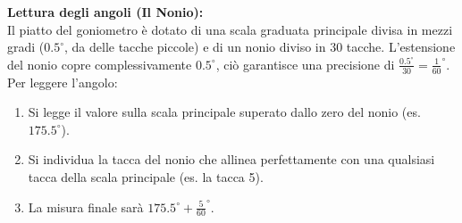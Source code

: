 \documentclass[openany,a4paper,12pt]{book}
\begin{document}
\textbf{Lettura degli angoli (Il Nonio):}\\
Il piatto del goniometro è dotato di una scala graduata principale divisa in mezzi gradi ($0.5^\circ$, da delle tacche piccole) e di un nonio diviso in 30 tacche. L'estensione del nonio copre complessivamente $0.5^\circ$, ciò garantisce una precisione di $\frac{0.5^\circ}{30} = \frac{1}{60}^\circ$.
Per leggere l'angolo:
\begin{enumerate}
    \item Si legge il valore sulla scala principale superato dallo zero del nonio (es. $175.5^\circ$).
    \item Si individua la tacca del nonio che allinea perfettamente con una qualsiasi tacca della scala principale (es. la tacca 5).
    \item La misura finale sarà $175.5^\circ + \frac{5}{60}^\circ$.
\end{enumerate}
\end{document}
